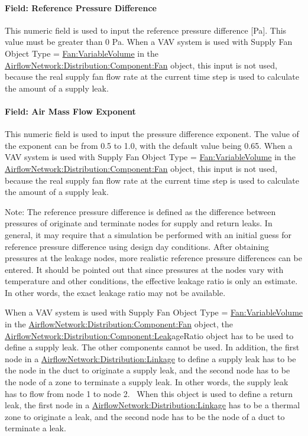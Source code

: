 \paragraph{Field: Reference Pressure Difference}\label{field-reference-pressure-difference-1}

This numeric field is used to input the reference pressure difference {[}Pa{]}. This value must be greater than 0 Pa. When a VAV system is used with Supply Fan Object Type = \hyperref[fanvariablevolume]{Fan:VariableVolume} in the \hyperref[airflownetworkdistributioncomponentfan]{AirflowNetwork:Distribution:Component:Fan} object, this input is not used, because the real supply fan flow rate at the current time step is used to calculate the amount of a supply leak.

\paragraph{Field: Air Mass Flow Exponent}\label{field-air-mass-flow-exponent-3}

This numeric field is used to input the pressure difference exponent. The value of the exponent can be from 0.5 to 1.0, with the default value being 0.65. When a VAV system is used with Supply Fan Object Type = \hyperref[fanvariablevolume]{Fan:VariableVolume} in the \hyperref[airflownetworkdistributioncomponentfan]{AirflowNetwork:Distribution:Component:Fan} object, this input is not used, because the real supply fan flow rate at the current time step is used to calculate the amount of a supply leak.

Note: The reference pressure difference is defined as the difference between pressures of originate and terminate nodes for supply and return leaks. In general, it may require that a simulation be performed with an initial guess for reference pressure difference using design day conditions. After obtaining pressures at the leakage nodes, more realistic reference pressure differences can be entered. It should be pointed out that since pressures at the nodes vary with temperature and other conditions, the effective leakage ratio is only an estimate. In other words, the exact leakage ratio may not be available.

When a VAV system is used with Supply Fan Object Type = \hyperref[fanvariablevolume]{Fan:VariableVolume} in the \hyperref[airflownetworkdistributioncomponentfan]{AirflowNetwork:Distribution:Component:Fan} object, the \hyperref[airflownetworkdistributioncomponentleak]{AirflowNetwork:Distribution:Component:Leak}ageRatio object has to be used to define a supply leak. The other components cannot be used. In addition, the first node in a \hyperref[airflownetworkdistributionlinkage]{AirflowNetwork:Distribution:Linkage} to define a supply leak has to be the node in the duct to originate a supply leak, and the second node has to be the node of a zone to terminate a supply leak. In other words, the supply leak has to flow from node 1 to node 2. ~When this object is used to define a return leak, the first node in a \hyperref[airflownetworkdistributionlinkage]{AirflowNetwork:Distribution:Linkage} has to be a thermal zone to originate a leak, and the second node has to be the node of a duct to terminate a leak.

